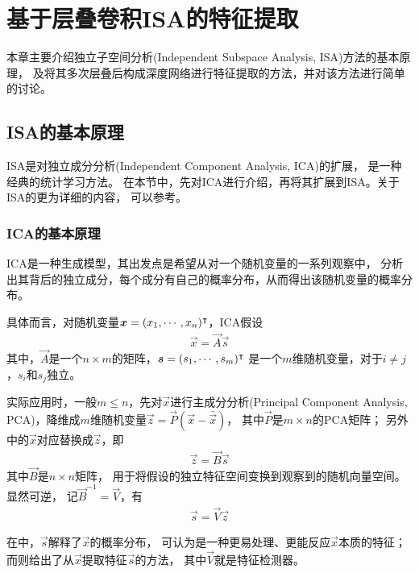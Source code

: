 
\chapter{基于层叠卷积ISA的特征提取}
本章主要介绍独立子空间分析(Independent Subspace Analysis, ISA)方法的基本原理，
及将其多次层叠后构成深度网络进行特征提取的方法，并对该方法进行简单的讨论。

\section{ISA的基本原理}
ISA是对独立成分分析(Independent Component Analysis, ICA)的扩展，
是一种经典的统计学习方法。
在本节中，先对ICA进行介绍，再将其扩展到ISA。关于ISA的更为详细的内容，
可以参考\cite{hyvarinen2009natural}。


\subsection{ICA的基本原理}
ICA是一种生成模型，其出发点是希望从对一个随机变量的一系列观察中，
分析出其背后的独立成分，每个成分有自己的概率分布，从而得出该随机变量的概率分布。

具体而言，对随机变量$\boldsymbol{x} = (x_1, \cdots, x_n)^\intercal$，ICA假设
\begin{eqnarray}
    \vec{x} = \vec{A}\vec{s}
    \label{eqn:ica:0}
\end{eqnarray}
其中，$\vec{A}$是一个$n\times m$的矩阵，$\boldsymbol{s}=(s_1,\cdots,s_m)^\intercal$
是一个$m$维随机变量，对于$i\neq j$，$s_i$和$s_j$独立。

实际应用时，一般$m \le n$，先对$\vec{x}$进行主成分分析(Principal Component
Analysis, PCA)，降维成$m$维随机变量$\vec{z}=\vec{P}(\vec{x}-\bar{\vec{x}})$，
其中$\vec{P}$是$m \times n$的PCA矩阵；
另外中的$\vec{x}$对应替换成$\vec{z}$，即
\begin{eqnarray}
    \vec{z} = \vec{B}\vec{s}
    \label{eqn:ica:1}
\end{eqnarray}
其中$\vec{B}$是$n\times n$矩阵，
用于将假设的独立特征空间变换到观察到的随机向量空间。显然可逆，
记$\vec{B}^{-1}=\vec{V}$，有
\begin{eqnarray}
    \vec{s} = \vec{V}\vec{z}
    \label{eqn:ica:2}
\end{eqnarray}

在中，$\vec{s}$解释了$\vec{x}$的概率分布，
可认为是一种更易处理、更能反应$\vec{x}$本质的特征；
而则给出了从$\vec{x}$提取特征$\vec{s}$的方法，
其中$\vec{V}$就是特征检测器。

